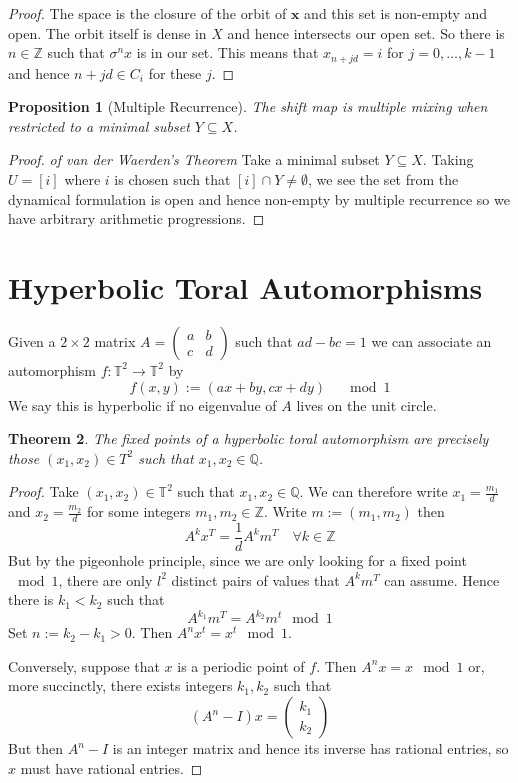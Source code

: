 \documentclass[11pt]{article}
\newcommand{\defeq}{:=}
\newcommand{\Z}{\mathbb{Z}}
\newcommand{\Q}{\mathbb{Q}}
\newcommand{\mv}[1]{\textbf{#1}}
\newenvironment{defin}
	{\begin{mdframed}[backgroundcolor=white, roundcorner=5pt, linewidth=1pt, linecolor=Green]
		\setlength{\parindent}{0pt}}
	{\end{mdframed}}
\newcommand{\mdf}[1]{{\color{Green} #1}}
\newtheorem{theorem}{Theorem}[section]
\newtheorem{prop}[theorem]{Proposition}
\begin{document}
\begin{proof}
The space is the closure of the orbit of $\mv{x}$ and this set is non-empty and open.
The orbit itself is dense in $X$ and hence intersects our open set.
So there is $n\in\Z$ such that $\sigma^n x$ is in our set.
This means that $x_{n+jd}=i$ for $j=0, \dots, k-1$ and hence $n+jd\in C_i$ for these $j$.
\end{proof}

\begin{prop}[Multiple Recurrence]
The shift map is multiple mixing when restricted to a minimal subset $Y\subseteq X$.
\end{prop}

\begin{proof}
\textit{of van der Waerden's Theorem}
Take a minimal subset $Y\subseteq X$.
Taking $U=[i]$ where $i$ is chosen such that $[i]\cap Y \neq \emptyset$, we see the set from the dynamical formulation is open and hence non-empty by multiple recurrence so we have arbitrary arithmetic progressions.
\end{proof}

\section{Hyperbolic Toral Automorphisms}

\begin{defin}
Given a $2\times 2$ matrix $A=
\begin{pmatrix}
	a & b \\
	c & d
\end{pmatrix}$ such that $ad-bc=1$ we can associate an automorphism $f:\mathbb{T}^2\to\mathbb{T}^2$ by
\[
	f(x,y)\defeq (ax + by, cx + dy) \quad \mod 1
\]
We say this is \mdf{hyperbolic} if no eigenvalue of $A$ lives on the unit circle.
\end{defin}

\begin{theorem}
The fixed points of a hyperbolic toral automorphism are precisely those $(x_1,x_2)\in T^2$ such that $x_1, x_2\in\Q$.
\end{theorem}

\begin{proof}
Take $(x_1, x_2)\in\mathbb{T}^2$ such that $x_1, x_2\in\Q$.
We can therefore write $x_1=\frac{m_1}{d}$ and $x_2=\frac{m_2}{d}$ for some integers $m_1, m_2\in\Z$.
Write $m\defeq(m_1, m_2)$ then
\[
	A^k x^T = \frac{1}{d} A^k m^T\quad\forall k\in\Z
\]
But by the pigeonhole principle, since we are only looking for a fixed point $\mod 1$, there are only $l^2$ distinct pairs of values that $A^km^T$ can assume.
Hence there is $k_1 < k_2$ such that
\[
	A^{k_1}m^T = A^{k_2}m^t \mod 1
\]
Set $n\defeq k_2 - k_1 > 0 $.
Then $A^n x^t = x^t \mod 1$.

Conversely, suppose that $x$ is a periodic point of $f$.
Then $A^n x = x \mod 1$ or, more succinctly, there exists integers $k_1, k_2$ such that
\[
	(A^n - I) x =
	\begin{pmatrix}
	k_1 \\
	k_2
	\end{pmatrix}
\]
But then $A^n - I$ is an integer matrix and hence its inverse has rational entries, so $x$ must have rational entries.
\end{proof}
\end{document}
